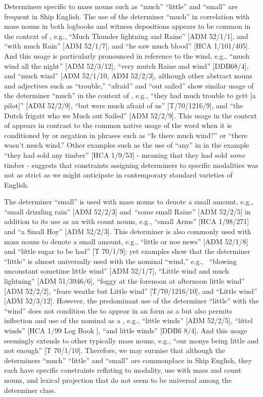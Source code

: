 Determiners specific to mass nouns such as “much” “little” and “small” are frequent in Ship English. The use of the determiner “much” in correlation with mass nouns in both logbooks and witness depositions appears to be common in the context of , e.g., “Much Thunder lightning and Raine” [ADM 52/1/1], and “with much Rain” [ADM 52/1/7], and “he saw much blood” [HCA 1/101/405]. And this usage is particularly pronounced in reference to the wind, e.g., “much wind all the night” [ADM 52/3/12], “very mutch Raine and wind” [DDB68/4], and “much wind” [ADM 52/1/10, ADM 52/2/3], although other abstract nouns and adjectives such as “trouble,” “afraid” and “out sailed” show similar usage of the determiner “much” in the context of , e.g., “they had much trouble to gett [a pilot]” [ADM 52/2/9], “but were much afraid of us” [T/70/1216/9], and “the Dutch frigatt who we Much out Sailed” [ADM 52/2/9]. This usage in the context of  appears in contrast to the common native usage of the word when it is conditioned by  or negation in phrases such as “Is there much wind?” or “there wasn’t much wind.” Other examples such as the use of “any” in  in the example “they had sold any timber” [HCA 1/9/53] - meaning that they had sold \textit{some} timber - suggests that constraints assigning determiners to specific modalities was not as strict as we might anticipate in contemporary standard varieties of English.  

The determiner “small” is used with  mass nouns to denote a small amount, e.g., “small drizzling rain” [ADM 52/2/3] and~“some small Raine” [ADM 52/2/5] in addition to its use as an  with count nouns, e.g., “small Arms” [HCA 1/98/271] and “a Small Hoy” [ADM 52/2/3]. This determiner is also commonly used with  mass nouns to denote a small amount, e.g., “little or noe news” [ADM 52/1/8] and “little sugar to be had” [T 70/1/9]; yet examples show that the determiner “little” is almost universally used with the nominal “wind,” e.g., ~“blowing unconstant sometime little wind” [ADM 52/1/7], “Little wind and much lightning” [ADM 51/3946/6], “foggy at the forenoon at afternoon little wind” [ADM 52/2/2], “feare weathr but Little wind” [T/70/1216/10], and “Little wind” [ADM 52/3/12]. However, the predominant use of the determiner “little” with the  “wind” does not condition the  to appear in an  form as a  but also permits inflection and use of the nominal as a , e.g., “little winds” [ADM 52/2/5], “littel winds” [HCA 1/99 Log Book \citealt{Pideaux1731}], “and little winds” [DDB6 8/4]. And this usage seemingly extends to other typically mass nouns, e.g., “our monys being little and not enough” [T 70/1/10]. Therefore, we may surmise that although the determiners “much” “little” and “small” are commonplace in Ship English, they each have specific constraints reflating to modality, use with mass and count nouns, and lexical projection that do not seem to be universal among the determiner class.  

